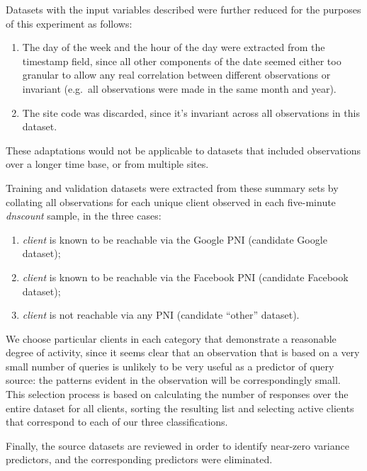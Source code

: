 \documentclass[conference]{IEEEtran}
\let\tightlist\relax %
\begin{document}
Datasets with the input variables described were further reduced for the
purposes of this experiment as follows:

\begin{enumerate}
\def\labelenumi{\arabic{enumi}.}
\tightlist
\item
  The day of the week and the hour of the day were extracted from the
  timestamp field, since all other components of the date seemed either
  too granular to allow any real correlation between different
  observations or invariant (e.g.~all observations were made in the same
  month and year).
\item
  The site code was discarded, since it's invariant across all
  observations in this dataset.
\end{enumerate}

These adaptations would not be applicable to datasets that included
observations over a longer time base, or from multiple sites.

Training and validation datasets were extracted from these summary sets
by collating all observations for each unique client observed in each
five-minute \emph{dnscount} sample, in the three cases:

\begin{enumerate}
\def\labelenumi{\arabic{enumi}.}
\tightlist
\item
  \emph{client} is known to be reachable via the Google PNI (candidate
  Google dataset);
\item
  \emph{client} is known to be reachable via the Facebook PNI (candidate
  Facebook dataset);
\item
  \emph{client} is not reachable via any PNI (candidate ``other''
  dataset).
\end{enumerate}

We choose particular clients in each category that demonstrate a
reasonable degree of activity, since it seems clear that an observation
that is based on a very small number of queries is unlikely to be very
useful as a predictor of query source: the patterns evident in the
observation will be correspondingly small. This selection process is
based on calculating the number of responses over the entire dataset for
all clients, sorting the resulting list and selecting active clients
that correspond to each of our three classifications.

Finally, the source datasets are reviewed in order to identify near-zero
variance predictors, and the corresponding predictors were eliminated.
\end{document}
